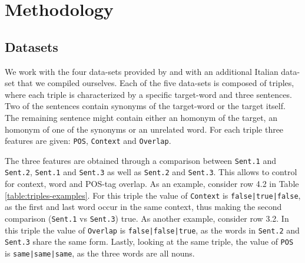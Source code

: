 \section{Methodology}

\subsection{Datasets}
We work with the four data-sets provided by \citet{garcia:acl} and with an additional Italian data-set that we compiled ourselves. Each of the five data-sets is composed of triples, where each triple is characterized by a specific target-word and three sentences. Two of the sentences contain synonyms of the target-word or the target itself. The remaining sentence might contain either an homonym of the target, an homonym of one of the synonyms or an unrelated word. For each triple three features are given: \texttt{POS}, \texttt{Context} and \texttt{Overlap}.

The three features are obtained through a comparison between \texttt{Sent.1} and \texttt{Sent.2}, \texttt{Sent.1} and \texttt{Sent.3} as well as \texttt{Sent.2} and \texttt{Sent.3}. This allows to control for context, word and POS-tag overlap. As an example, consider row 4.2 in Table \ref{table:triples-examples}. For this triple the value of \texttt{Context} is \texttt{false|true|false}, as the first and last word occur in the same context, thus making the second comparison (\texttt{Sent.1} vs \texttt{Sent.3}) true. As another example, consider row 3.2. In this triple the value of \texttt{Overlap} is \texttt{false|false|true}, as the words in \texttt{Sent.2} and \texttt{Sent.3} share the same form. Lastly, looking at the same triple, the value of \texttt{POS} is \texttt{same|same|same}, as the three words are all nouns.

